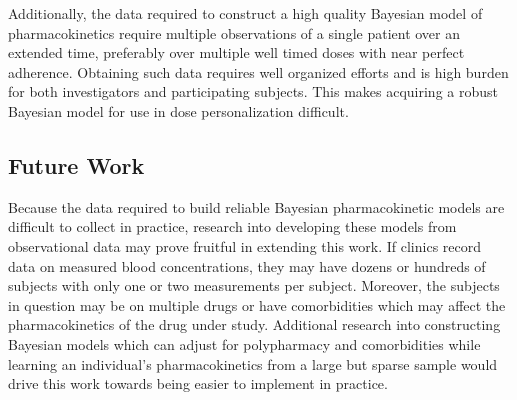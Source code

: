 Additionally, the data required to construct a high quality Bayesian model of pharmacokinetics require multiple observations of a single patient over an extended time, preferably over multiple well timed doses with near perfect adherence.  Obtaining such data requires well organized efforts and is high burden for both investigators and participating subjects.  This makes acquiring a robust Bayesian model for use in dose personalization difficult.



\subsection{Future Work}

Because the data required to build reliable Bayesian pharmacokinetic models are difficult to collect in practice, research into developing these models from observational data may prove fruitful in extending this work. If clinics record data on measured blood concentrations, they may have dozens or hundreds of subjects with only one or two measurements per subject.  Moreover, the subjects in question may be on multiple drugs or have comorbidities which may affect the pharmacokinetics of the drug under study.  Additional research into constructing Bayesian models which can adjust for polypharmacy and comorbidities while learning an individual’s pharmacokinetics from a large but sparse sample would drive this work towards being easier to implement in practice.


